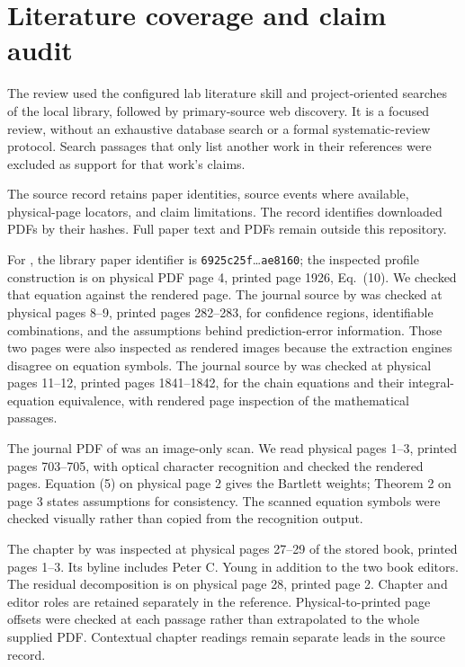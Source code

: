 \section{Literature coverage and claim audit}
The review used the configured lab literature skill and project-oriented searches
of the local library, followed by primary-source web discovery. It is a focused
review, without an exhaustive database search or a formal systematic-review
protocol. Search passages that only list another work in their references were
excluded as support for that work's claims.

The source record  retains paper identities,
source events where available, physical-page locators, and claim limitations.
The record  identifies downloaded PDFs
by their hashes. Full paper text and PDFs remain outside this repository.

For \citet{raue-2009-structural}, the library paper identifier is
\texttt{6925c25f}\ldots\texttt{ae8160}; the inspected profile construction is
on physical PDF page 4, printed page 1926, Eq.~(10). We checked that equation
against the rendered page. The journal source by
\citet{hjalmarsson-2009-system} was checked at physical pages 8--9, printed
pages 282--283, for confidence
regions, identifiable combinations, and the assumptions behind prediction-error
information. Those two pages were also inspected as rendered images because
the extraction engines disagree on equation symbols. The journal source by
\citet{hurtado-2019-generalizations} was checked at physical pages 11--12,
printed pages 1841--1842,
for the chain equations and their integral-equation equivalence, with rendered
page inspection of the mathematical passages.

The journal PDF of \citet{newey-1987-simple} was an image-only scan. We read physical pages
1--3, printed pages 703--705, with optical character recognition and checked
the rendered pages. Equation (5) on physical page 2 gives the Bartlett weights;
Theorem 2 on page 3 states assumptions for consistency. The scanned equation
symbols were checked visually rather than copied from the recognition output.

The chapter by \citet{garnier-2008-direct} was inspected at physical pages 27--29 of the
stored book, printed pages 1--3. Its byline includes Peter C. Young in addition
to the two book editors. The residual decomposition is on physical page 28,
printed page 2. Chapter and editor roles are retained separately in the reference.
Physical-to-printed page offsets were checked at each passage rather than
extrapolated to the whole supplied PDF. Contextual chapter readings remain
separate leads in the source record.

